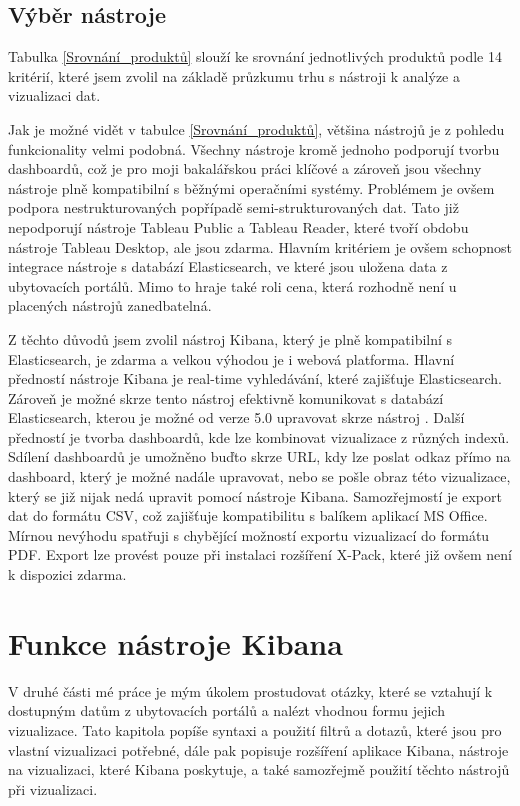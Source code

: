 \documentclass[czech,BP]{thesiskiv}
\begin{document}
\renewcommand{\arraystretch}{1}

\section{Výběr nástroje}
Tabulka \ref{Srovnání_produktů} slouží ke srovnání jednotlivých produktů podle 14 kritérií, které jsem zvolil na základě průzkumu trhu s nástroji k analýze a vizualizaci dat.


Jak je možné vidět v tabulce \ref{Srovnání_produktů}, většina nástrojů je z pohledu funkcionality velmi podobná. Všechny nástroje kromě jednoho podporují tvorbu dashboardů, což je pro moji bakalářskou práci klíčové a zároveň jsou všechny nástroje plně kompatibilní s běžnými operačními systémy. Problémem je ovšem podpora nestrukturovaných popřípadě semi-strukturovaných dat. Ta\-to již nepodporují nástroje Tableau Public a Tableau Reader, které tvoří obdobu nástroje Tableau Desktop, ale jsou zdarma. Hlavním kritériem je ovšem schopnost integrace nástroje s databází Elasticsearch, ve které jsou uložena data z ubytovacích portálů. Mimo to hraje také roli cena, která rozhodně není u placených nástrojů zanedbatelná. 


Z těchto důvodů jsem zvolil nástroj Kibana, který je plně kompatibilní s Elasticsearch, je zdarma a velkou výhodou je i webová platforma. Hlavní předností nástroje Kibana je real-time vyhledávání, které zajišťuje Elasticsearch. Zároveň je možné skrze tento nástroj efektivně komunikovat s databází Elasticsearch, kterou je možné od verze 5.0 upravovat skrze nástroj . Další předností je tvorba dashboardů, kde lze kombinovat vizualizace z různých indexů. Sdílení dashboardů je umožněno buďto skrze URL, kdy lze poslat odkaz přímo na dashboard, který je možné nadále upravovat, nebo se pošle obraz této vizualizace, který se již nijak nedá upravit pomocí nástroje Kibana. Samozřejmostí je export dat do formátu CSV, což zajišťuje kompatibilitu s balíkem aplikací MS Office. Mírnou nevýhodu spatřuji s chybějící možností exportu vizualizací do formátu PDF. Export lze provést pouze při instalaci rozšíření X-Pack, které již ovšem není k dispozici zdarma.
\chapter{Funkce nástroje Kibana}
\label{Funkce_nástroje}
V druhé části mé práce je mým úkolem prostudovat otázky, které se vztahují k dostupným datům z ubytovacích portálů a nalézt vhodnou formu jejich vizualizace. Tato kapitola popíše syntaxi a použití filtrů a  dotazů, které jsou pro vlastní vizualizaci potřebné, dále pak popisuje rozšíření aplikace Kibana, nástroje na vizualizaci, které Kibana poskytuje, a také samozřejmě použití těchto nástrojů při vizualizaci.
\end{document}
